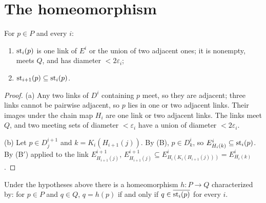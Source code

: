 
\section{The homeomorphism}

\begin{lemma}\label{lem:star-props}
For $p\in P$ and every $i$:
\begin{enumerate}[label=(\alph*)]
\item $\operatorname{st}_i(p)$ is one link of $E^i$ or the union of two adjacent ones; it is nonempty, meets $Q$, and has diameter $<2\varepsilon_i$;
\item $\operatorname{st}_{i+1}(p)\subseteq\operatorname{st}_i(p)$.
\end{enumerate}
\end{lemma}

\begin{proof}
(a) Any two links of $D^i$ containing $p$ meet, so they are adjacent; three links cannot be pairwise adjacent, so $p$ lies in one or two adjacent links. Their images
under the chain map $H_i$ are one link or two adjacent links. The links meet $Q$, and two meeting sets of diameter $<\varepsilon_i$ have a union of diameter $<2\varepsilon_i$.

(b) Let $p\in D^{i+1}_j$ and $k=K_i(H_{i+1}(j))$. By (B), $p\in D^i_k$, so $E^i_{H_i(k)}\subseteq\operatorname{st}_i(p)$. By (B$'$) applied to the link $E^{i+1}_{H_{i+1}(j)}$,
$E^{i+1}_{H_{i+1}(j)}\subseteq E^i_{H_i(K_i(H_{i+1}(j)))}=E^i_{H_i(k)}$.
\end{proof}


\begin{theorem}\label{thm:zigzag}
Under the hypotheses above there is a homeomorphism $h\colon P\to Q$ characterized by: for $p\in P$ and $q\in Q$, $q=h(p)$ if and only if $q\in\overline{\operatorname{st}_i(p)}$ for every $i$.
\end{theorem}

